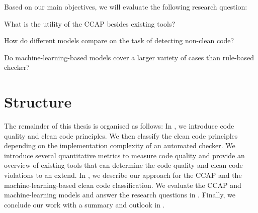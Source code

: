 Based on our main objectives, we will evaluate the following research question:
\begin{description}
    \setlength{\itemsep}{1pt}
    \item[RQ1]What is the utility of the CCAP besides existing tools? 
    \item[RQ2]How do different models compare on the task of detecting non-clean code?
    \item[RQ3]Do machine-learning-based models cover a larger variety of cases than rule-based checker? 
\end{description}


\section{Structure}
The remainder of this thesis is organised as follows: In , we introduce code quality and clean code principles. We then classify the clean code principles depending on the implementation complexity of an automated checker. We introduce several quantitative metrics to measure code quality and provide an overview of existing tools that can determine the code quality and clean code violations to an extend. 
In , we describe our approach for the CCAP and the machine-learning-based clean code classification. We evaluate the CCAP and machine-learning models and answer the research questions in . Finally, we conclude our work with a summary and outlook in .